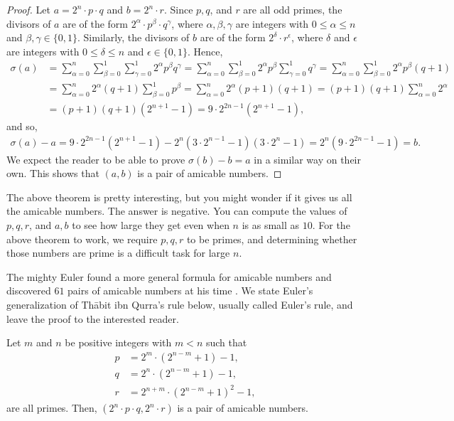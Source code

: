 \documentclass[12pt]{subfile}
\begin{document}
	\begin{proof}
		Let $a=2^n\cdot p \cdot q$ and  $b=2^n\cdot r$. Since $p, q$, and $r$ are all odd primes, the divisors of $a$ are of the form $2^{\alpha}\cdot p^{\beta} \cdot q^{\gamma}$, where $\alpha, \beta, \gamma $ are integers with $0\leq \alpha \leq n$ and $\beta, \gamma \in \{0, 1\}$. Similarly, the divisors of $b$ are of the form $2^{\delta} \cdot r^{\epsilon}$, where $\delta$ and $\epsilon$ are integers with $0 \leq \delta \leq n$ and $\epsilon \in \{0,1\}$. Hence,
		\begin{align*}
			\sigma(a) &= \sum_{\alpha=0}^{n} \sum_{\beta=0}^{1} \sum_{\gamma=0}^1 2^{\alpha} p^{\beta}  q^{\gamma} = \sum_{\alpha=0}^{n} \sum_{\beta=0}^{1} 2^{\alpha} p^{\beta}   \sum_{\gamma=0}^1 q^{\gamma}   = \sum_{\alpha=0}^{n} \sum_{\beta=0}^{1} 2^{\alpha} p^{\beta}   (q+1) \\
			&= \sum_{\alpha=0}^{n} 2^{\alpha} (q+1) \sum_{\beta=0}^{1} p^{\beta} = \sum_{\alpha=0}^{n} 2^{\alpha} (p+1)(q+1) = (p+1)(q+1)  \sum_{\alpha=0}^{n} 2^{\alpha} \\
			&=  (p+1)(q+1) \left(2^{n+1} - 1\right) = 9 \cdot 2^{2n-1} \left(2^{n+1} - 1\right),
		\end{align*}
		and so,
		\begin{align*}
			\sigma(a)-a =  9 \cdot 2^{2n-1} \left(2^{n+1} - 1\right) - 2^n \left(3 \cdot 2^{n-1} - 1\right) \left(3 \cdot 2^{n} - 1\right) = 2^n \left(9 \cdot 2^{2n-1}-1\right) = b.
		\end{align*}
		We expect the reader to be able to prove $\sigma(b)-b=a$ in a similar way on their own. This shows that $(a,b)$ is a pair of amicable numbers.
	\end{proof}
	
	The above theorem is pretty interesting, but you might wonder if it gives us all the amicable numbers. The answer is negative. You can compute the values of $p, q, r$, and $a,b$ to see how large they get even when $n$ is as small as $10$. For the above theorem to work, we require $p,q,r$ to be primes, and determining whether those numbers are prime is a difficult task for large $n$.
	
	The mighty Euler found a more general formula for amicable numbers and discovered $61$ pairs of amicable numbers at his time \cite{ch:arithfunc-dickson}. We state Euler's generalization of Th\={a}bit ibn Qurra's rule below, usually called Euler's rule, and leave the proof to the interested reader.
	
	\begin{theorem}
		Let $m$ and $n$ be positive integers with $m<n$ such that
		\begin{align*}
			p & = 2^m \cdot \left(2^{n-m}+1\right) - 1,\\
			q & = 2^n \cdot  \left(2^{n-m}+1\right)  - 1,\\
			r & = 2^{n+m}\cdot  \left(2^{n-m}+1\right)^2  - 1,
		\end{align*}
		are all primes. Then, $(2^n\cdot p \cdot q,  2^n\cdot r)$ is a pair of amicable numbers. 
	\end{theorem}
	
\end{document}
